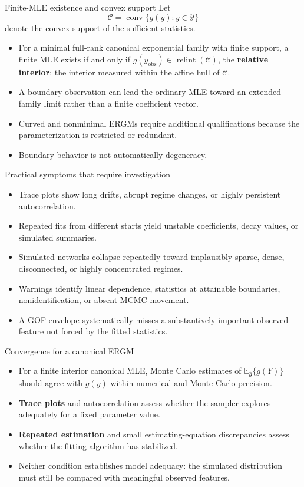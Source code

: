\documentclass[aspectratio=169,11pt]{beamer}
\newcommand{\E}{\mathbb{E}}
\newcommand{\term}[1]{\textbf{\color{nupurple}#1}}
\begin{document}
\begin{frame}{Finite-MLE existence and convex support}
Let
\[
\mathcal{C}=\operatorname{conv}\{g(y):y\in\mathcal{Y}\}
\]
denote the convex support of the sufficient statistics.
\begin{itemize}
\item For a minimal full-rank canonical exponential family with finite support, a finite MLE exists if and only if $g(y_{\mathrm{obs}})\in\operatorname{relint}(\mathcal{C})$, the \term{relative interior}: the interior measured within the affine hull of $\mathcal{C}$.
\item A boundary observation can lead the ordinary MLE toward an extended-family limit rather than a finite coefficient vector.
\item Curved and nonminimal ERGMs require additional qualifications because the parameterization is restricted or redundant.
\item \alert{Boundary behavior is not automatically degeneracy.}
\end{itemize}
\end{frame}

\begin{frame}{Practical symptoms that require investigation}
\begin{itemize}
\item Trace plots show long drifts, abrupt regime changes, or highly persistent autocorrelation.
\item Repeated fits from different starts yield unstable coefficients, decay values, or simulated summaries.
\item Simulated networks collapse repeatedly toward implausibly sparse, dense, disconnected, or highly concentrated regimes.
\item Warnings identify linear dependence, statistics at attainable boundaries, nonidentification, or absent MCMC movement.
\item A GOF envelope systematically misses a substantively important observed feature not forced by the fitted statistics.
\end{itemize}
\end{frame}

\begin{frame}{Convergence for a canonical ERGM}
\begin{itemize}
\item For a finite interior canonical MLE, Monte Carlo estimates of $\E_{\hat\theta}\{g(Y)\}$ should agree with $g(y)$ within numerical and Monte Carlo precision.
\item \term{Trace plots} and autocorrelation assess whether the sampler explores adequately for a fixed parameter value.
\item \term{Repeated estimation} and small estimating-equation discrepancies assess whether the fitting algorithm has stabilized.
\item Neither condition establishes model adequacy: the simulated distribution must still be compared with meaningful observed features.
\end{itemize}
\end{frame}
\end{document}
